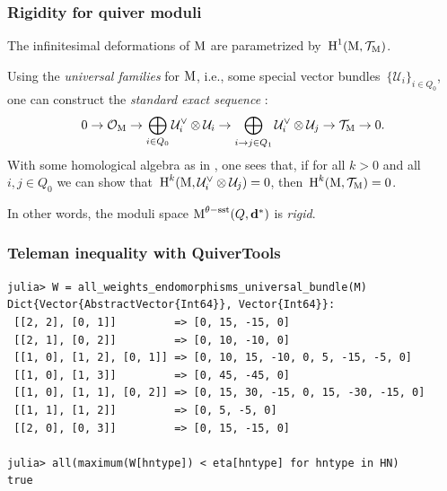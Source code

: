 \documentclass{beamer}
\begin{document}
\begin{frame}
    \frametitle{Rigidity for quiver moduli}
The infinitesimal deformations of $\operatorname{M}$ are parametrized
by~$\operatorname{H}^1(\operatorname{M}, \mathcal{T}_{\operatorname{M}})$. \pause

Using the \emph{universal families} for $\operatorname{M}$, i.e.,
some special vector bundles~$\{\mathcal{U}_i\}_{i \in Q_0}$,
one can construct the \emph{standard exact sequence} \cite{vector-fields-paper}:
\begin{equation}\label{equation:4-term-exact-sequence}
0
\overset{}{\rightarrow}\mathcal{O}_{\operatorname{M}}
\overset{}{\rightarrow}\bigoplus_{i \in Q_0} \mathcal{U}^\vee_i \otimes \mathcal{U}_i
\overset{}{\rightarrow}\bigoplus_{i \overset{}{\rightarrow} j \in Q_1} \mathcal{U}^\vee_{i} \otimes \mathcal{U}_{j}
\overset{}{\rightarrow}\mathcal{T}_{\operatorname{M}}
\overset{}{\rightarrow} 0.
\end{equation} \pause
With some homological algebra as in \cite{rigidity-paper}, one sees that, if for all $k > 0$ and all $i,j \in Q_0$
we can show that~$\operatorname{H}^k(\operatorname{M}, \mathcal{U}^{\vee}_i \otimes \mathcal{U}_j) = 0$,
then~$\operatorname{H}^k(\operatorname{M}, \mathcal{T}_{\operatorname{M}}) = 0$. \pause

In other words, the moduli space $\operatorname{M}^{\theta-\mathrm{sst}}(Q, \mathbf{d}^*)$
is \emph{rigid}.
\end{frame}

\begin{frame}[fragile]
    \frametitle{Teleman inequality with QuiverTools}
\scriptsize{
\begin{lstlisting}
julia> W = all_weights_endomorphisms_universal_bundle(M)
Dict{Vector{AbstractVector{Int64}}, Vector{Int64}}:
 [[2, 2], [0, 1]]         => [0, 15, -15, 0]
 [[2, 1], [0, 2]]         => [0, 10, -10, 0]
 [[1, 0], [1, 2], [0, 1]] => [0, 10, 15, -10, 0, 5, -15, -5, 0]
 [[1, 0], [1, 3]]         => [0, 45, -45, 0]
 [[1, 0], [1, 1], [0, 2]] => [0, 15, 30, -15, 0, 15, -30, -15, 0]
 [[1, 1], [1, 2]]         => [0, 5, -5, 0]
 [[2, 0], [0, 3]]         => [0, 15, -15, 0]

julia> all(maximum(W[hntype]) < eta[hntype] for hntype in HN)
true
\end{lstlisting}
}
\end{frame}
\end{document}
